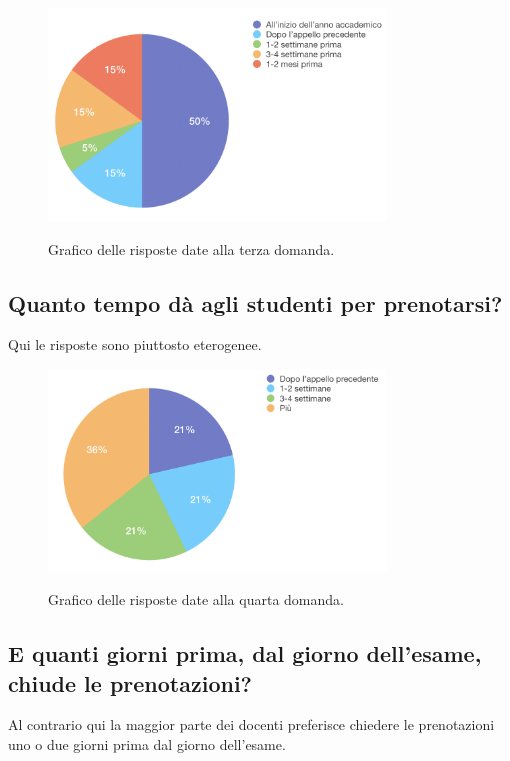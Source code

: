 \documentclass[Lau, oneside, noexaminfo]{sapthesis}%
\begin{document}
\begin{figure}[H]
	\caption{Grafico delle risposte date alla terza domanda.}
	\centering
	\includegraphics[width=0.8\textwidth]{d-iii}
	\label{fig:d-iii}
\end{figure}

\subsection{Quanto tempo dà agli studenti per prenotarsi?}
Qui le risposte sono piuttosto eterogenee.

\begin{figure}[H]
	\caption{Grafico delle risposte date alla quarta domanda.}
	\centering
	\includegraphics[width=0.8\textwidth]{d-iv}
	\label{fig:d-iv}
\end{figure}

\subsection{E quanti giorni prima, dal giorno dell'esame, chiude le prenotazioni?}
Al contrario qui la maggior parte dei docenti preferisce chiedere le prenotazioni uno o due giorni prima dal giorno dell'esame. 
\end{document}
